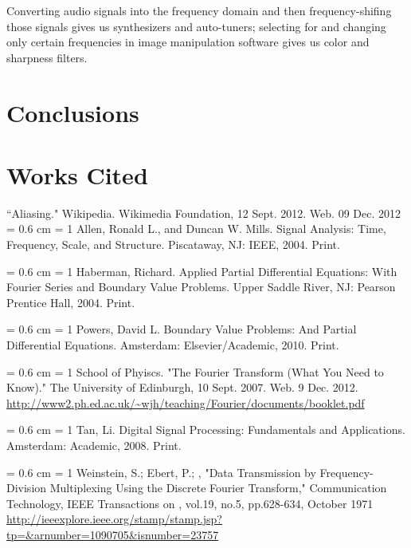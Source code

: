 \documentclass[12pt]{article}
\begin{document}
Converting audio signals into the frequency domain and then frequency-shifing 
those signals gives us synthesizers and auto-tuners; selecting for and 
changing only certain frequencies in image manipulation software gives us 
color and sharpness filters.


\section{Conclusions}

\section{Works Cited}
``Aliasing." Wikipedia. Wikimedia Foundation, 12 Sept. 2012. Web. 09 Dec. 2012
\vspace{0.3 cm} \noindent \hangindent = 0.6 cm \hangafter = 1 {Allen, Ronald
L., and Duncan W. Mills. Signal Analysis: Time, Frequency, Scale, and
Structure. Piscataway, NJ: IEEE, 2004. Print.}

\vspace{0.3 cm} \noindent \hangindent = 0.6 cm \hangafter = 1 Haberman,
Richard. Applied Partial Differential Equations: With Fourier Series and
Boundary Value Problems. Upper Saddle River, NJ: Pearson Prentice Hall, 2004.
Print.

\vspace{0.3 cm} \noindent \hangindent = 0.6 cm \hangafter = 1 Powers, David L.
Boundary Value Problems: And Partial Differential Equations. Amsterdam:
Elsevier/Academic, 2010. Print.

\vspace{0.3 cm} \noindent \hangindent = 0.6 cm \hangafter = 1 School of
Phyiscs. "The Fourier Transform (What You Need to Know)." The University of
Edinburgh, 10 Sept. 2007. Web. 9 Dec. 2012.
\url{http://www2.ph.ed.ac.uk/~wjh/teaching/Fourier/documents/booklet.pdf}

\vspace{0.3 cm} \noindent \hangindent = 0.6 cm \hangafter = 1 Tan, Li. Digital
Signal Processing: Fundamentals and Applications. Amsterdam: Academic, 2008.
Print.

\vspace{0.3 cm} \noindent \hangindent = 0.6 cm \hangafter = 1 Weinstein, S.;
Ebert, P.; , "Data Transmission by Frequency-Division Multiplexing Using the
Discrete Fourier Transform," Communication Technology, IEEE Transactions on ,
vol.19, no.5, pp.628-634, October 1971
\url{http://ieeexplore.ieee.org/stamp/stamp.jsp?tp=&arnumber=1090705&isnumber=23757}
\end{document}
